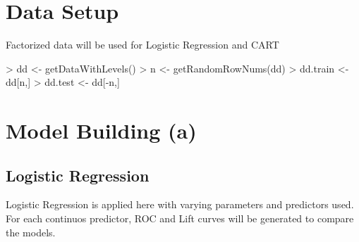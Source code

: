 \documentclass{article}
\begin{document}
\section*{Data Setup}
Factorized data will be used for Logistic Regression and CART
\begin{Schunk}
\begin{Sinput}
> dd <- getDataWithLevels()
> n <- getRandomRowNums(dd)
> dd.train <- dd[n,]
> dd.test <- dd[-n,]
\end{Sinput}
\end{Schunk}

\section*{Model Building (a)}
\subsection*{Logistic Regression}
Logistic Regression is applied here with varying parameters and predictors used. For each continuos predictor, ROC and Lift curves will be generated to compare the models. 
\end{document}
